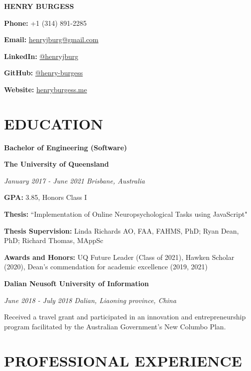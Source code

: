 \documentclass{article}
\begin{document}
  {\Huge\textbf{\uppercase{Henry Burgess}}}\hfill\begin{minipage}{0.26\linewidth}

  \textbf{Phone:} +1 (314) 891-2285

  \textbf{Email:} \href{mailto:henryjburg@gmail.com}{\color{blue}henryjburg@gmail.com}

  \textbf{LinkedIn:} \href{https://www.linkedin.com/in/henryjburg/}{\color{blue}@henryjburg}

  \textbf{GitHub:} \href{https://github.com/henry-burgess}{\color{blue}@henry-burgess}

  \textbf{Website:} \href{https://henryburgess.me/}{\color{blue}henryburgess.me}

  \end{minipage}

  \section*{\centering\uppercase{Education}}

  {\large\textbf{Bachelor of Engineering (Software)}}

  \textbf{The University of Queensland}

  \textit{January 2017 - June 2021 \hfill Brisbane, Australia}

  \textbf{GPA:} 3.85, Honors Class I

  \textbf{Thesis:} ``Implementation of Online Neuropsychological Tasks using JavaScript"

  \textbf{Thesis Supervision:} Linda Richards AO, FAA, FAHMS, PhD; Ryan Dean, PhD; Richard Thomas, MAppSc

  \textbf{Awards and Honors:} UQ Future Leader (Class of 2021), Hawken Scholar (2020), Dean's commendation for academic excellence (2019, 2021)

  \medbreak

  {\large\textbf{Dalian Neusoft University of Information}}

  \textit{June 2018 - July 2018 \hfill Dalian, Liaoning province, China}

  Received a travel grant and participated in an innovation and entrepreneurship program facilitated by the Australian Government's New Columbo Plan.

  \section*{\centering\uppercase{Professional Experience}}
\end{document}
